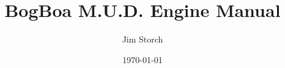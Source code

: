 \documentclass{article}
\begin{document}
\title{BogBoa M.U.D. Engine Manual}
\author{Jim Storch}
\date{\today}
\maketitle




%
\end{document}
